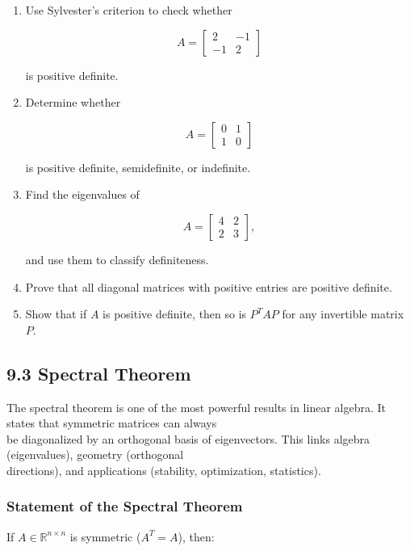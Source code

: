 \documentclass[
  12pt,
  a4paper,
]{article}
\begin{document}
\begin{enumerate}
\def\labelenumi{\arabic{enumi}.}
\item
  Use Sylvester's criterion to check whether

  \[A = \begin{bmatrix} 2 & -1 \\ -1 & 2 \end{bmatrix}\]

  is positive definite.
\item
  Determine whether

  \[A = \begin{bmatrix} 0 & 1 \\ 1 & 0 \end{bmatrix}\]

  is positive definite, semidefinite, or indefinite.
\item
  Find the eigenvalues of

  \[A = \begin{bmatrix} 4 & 2 \\ 2 & 3 \end{bmatrix},\]

  and use them to classify definiteness.
\item
  Prove that all diagonal matrices with positive entries are positive
  definite.
\item
  Show that if \(A\) is positive definite, then so is \(P^T A P\) for
  any invertible matrix \(P\).
\end{enumerate}

\subsection{9.3 Spectral Theorem}\label{93-spectral-theorem}

The spectral theorem is one of the most powerful results in linear
algebra. It states that symmetric matrices can always\\
be diagonalized by an orthogonal basis of eigenvectors. This links
algebra (eigenvalues), geometry (orthogonal\\
directions), and applications (stability, optimization, statistics).

\subsubsection{Statement of the Spectral
Theorem}\label{statement-of-the-spectral-theorem}

If \(A \in \mathbb{R}^{n \times n}\) is symmetric (\(A^T = A\)), then:
\end{document}
